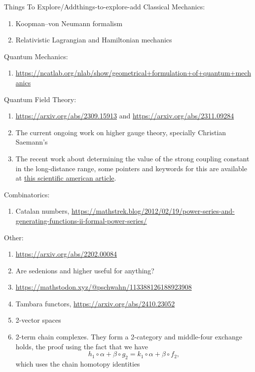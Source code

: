 \begin{remark}{Things To Explore/Add}{things-to-explore-add}
    Classical Mechanics:
    \begin{enumerate}
        \item Koopman--von Neumann formalism
        \item Relativistic Lagrangian and Hamiltonian mechanics
    \end{enumerate}
    Quantum Mechanics:
    \begin{enumerate}
        \item \url{https://ncatlab.org/nlab/show/geometrical+formulation+of+quantum+mechanics}
    \end{enumerate}
    Quantum Field Theory:
    \begin{enumerate}
        \item \url{https://arxiv.org/abs/2309.15913} and \url{https://arxiv.org/abs/2311.09284}
        \item The current ongoing work on higher gauge theory, specially Christian Saemann's
        \item The recent work about determining the value of the strong coupling constant in the long-distance range, some pointers and keywords for this are available at \href{https://www.scientificamerican.com/article/physicists-finally-know-how-the-strong-force-gets-its-strength/}{this scientific american article}.
    \end{enumerate}
    Combinatorics:
    \begin{enumerate}
        \item Catalan numbers, \url{https://mathstrek.blog/2012/02/19/power-series-and-generating-functions-ii-formal-power-series/}
    \end{enumerate}
    Other:
    \begin{enumerate}
        \item \url{https://arxiv.org/abs/2202.00084}
        \item Are sedenions and higher useful for anything?
        \item \url{https://mathstodon.xyz/@pschwahn/113388126188923908}
        \item Tambara functors, \url{https://arxiv.org/abs/2410.23052}
        \item 2-vector spaces
        \item 2-term chain complexes. They form a 2-category and middle-four exchange holds, the proof using the fact that we have
            \[
                h_{1}\circ\alpha+\beta\circ g_{2}%
                =%
                k_{1}\circ\alpha+\beta\circ f_{2},%
            \]%
            which uses the chain homotopy identities

\end{enumerate}
\end{remark}
